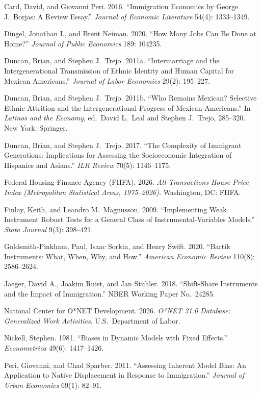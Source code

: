 \documentclass[11pt]{article}
\begin{document}
\begin{list}{}{%
  \setlength{\leftmargin}{1.5em}%
  \setlength{\itemindent}{-1.5em}%
  \setlength{\itemsep}{0.14em}%
  \setlength{\parsep}{0pt}%
}
\item Card, David, and Giovanni Peri. 2016. ``Immigration Economics by George J.\ Borjas: A Review Essay.'' \emph{Journal of Economic Literature} 54(4): 1333--1349.
\item Dingel, Jonathan I., and Brent Neiman. 2020. ``How Many Jobs Can Be Done at Home?'' \emph{Journal of Public Economics} 189: 104235.
\item Duncan, Brian, and Stephen J.\ Trejo. 2011a. ``Intermarriage and the Intergenerational Transmission of Ethnic Identity and Human Capital for Mexican Americans.'' \emph{Journal of Labor Economics} 29(2): 195--227.
\item Duncan, Brian, and Stephen J.\ Trejo. 2011b. ``Who Remains Mexican? Selective Ethnic Attrition and the Intergenerational Progress of Mexican Americans.'' In \emph{Latinos and the Economy}, ed.\ David L.\ Leal and Stephen J.\ Trejo, 285--320. New York: Springer.
\item Duncan, Brian, and Stephen J.\ Trejo. 2017. ``The Complexity of Immigrant Generations: Implications for Assessing the Socioeconomic Integration of Hispanics and Asians.'' \emph{ILR Review} 70(5): 1146--1175.
\item Federal Housing Finance Agency (FHFA). 2026. \emph{All-Transactions House Price Index (Metropolitan Statistical Areas, 1975--2026)}. Washington, DC: FHFA.
\item Finlay, Keith, and Leandro M.\ Magnusson. 2009. ``Implementing Weak Instrument Robust Tests for a General Class of Instrumental-Variables Models.'' \emph{Stata Journal} 9(3): 398--421.
\item Goldsmith-Pinkham, Paul, Isaac Sorkin, and Henry Swift. 2020. ``Bartik Instruments: What, When, Why, and How.'' \emph{American Economic Review} 110(8): 2586--2624.
\item Jaeger, David A., Joakim Ruist, and Jan Stuhler. 2018. ``Shift-Share Instruments and the Impact of Immigration.'' NBER Working Paper No.\ 24285.
\item National Center for O*NET Development. 2026. \emph{O*NET 31.0 Database: Generalized Work Activities}. U.S.\ Department of Labor.
\item Nickell, Stephen. 1981. ``Biases in Dynamic Models with Fixed Effects.'' \emph{Econometrica} 49(6): 1417--1426.
\item Peri, Giovanni, and Chad Sparber. 2011. ``Assessing Inherent Model Bias: An Application to Native Displacement in Response to Immigration.'' \emph{Journal of Urban Economics} 69(1): 82--91.

\end{list}
\end{document}
